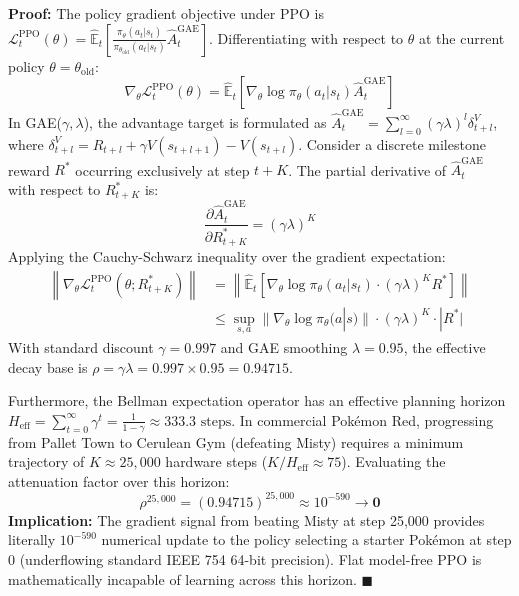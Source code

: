 \documentclass[conference]{IEEEtran}
\begin{document}
\textbf{Proof:} The policy gradient objective under PPO is $\mathcal{L}_t^{\text{PPO}}(\theta) = \hat{\mathbb{E}}_t \left[ \frac{\pi_\theta(a_t | s_t)}{\pi_{\theta_{\text{old}}}(a_t | s_t)} \hat{A}_t^{\text{GAE}} \right]$. Differentiating with respect to $\theta$ at the current policy $\theta = \theta_{\text{old}}$:
\begin{equation}
\nabla_\theta \mathcal{L}_t^{\text{PPO}}(\theta) = \hat{\mathbb{E}}_t \left[ \nabla_\theta \log \pi_\theta(a_t | s_t) \hat{A}_t^{\text{GAE}} \right]
\end{equation}
In GAE($\gamma, \lambda$), the advantage target is formulated as $\hat{A}_t^{\text{GAE}} = \sum_{l=0}^\infty (\gamma \lambda)^l \delta_{t+l}^V$, where $\delta_{t+l}^V = R_{t+l} + \gamma V(s_{t+l+1}) - V(s_{t+l})$. Consider a discrete milestone reward $R^*$ occurring exclusively at step $t+K$. The partial derivative of $\hat{A}_t^{\text{GAE}}$ with respect to $R_{t+K}^*$ is:
\begin{equation}
\frac{\partial \hat{A}_t^{\text{GAE}}}{\partial R_{t+K}^*} = (\gamma \lambda)^K
\end{equation}
Applying the Cauchy-Schwarz inequality over the gradient expectation:
\begin{align}
\left\| \nabla_\theta \mathcal{L}_t^{\text{PPO}}(\theta; R_{t+K}^*) \right\| &= \left\| \hat{\mathbb{E}}_t \left[ \nabla_\theta \log \pi_\theta(a_t | s_t) \cdot (\gamma \lambda)^K R^* \right] \right\| \nonumber \\
&\le \sup_{s, a} \|\nabla_\theta \log \pi_\theta(a | s)\| \cdot (\gamma \lambda)^K \cdot |R^*|
\end{align}
With standard discount $\gamma = 0.997$ and GAE smoothing $\lambda = 0.95$, the effective decay base is $\rho = \gamma \lambda = 0.997 \times 0.95 = 0.94715$. 

Furthermore, the Bellman expectation operator has an effective planning horizon $H_{\text{eff}} = \sum_{t=0}^\infty \gamma^t = \frac{1}{1 - \gamma} \approx 333.3\text{ steps}$. In commercial Pok{\'e}mon Red, progressing from Pallet Town to Cerulean Gym (defeating Misty) requires a minimum trajectory of $K \approx 25{,}000$ hardware steps ($K / H_{\text{eff}} \approx 75$). Evaluating the attenuation factor over this horizon:
\begin{equation}
\rho^{25{,}000} = (0.94715)^{25{,}000} \approx 10^{-590} \to \mathbf{0}
\end{equation}
\textbf{Implication:} The gradient signal from beating Misty at step 25,000 provides literally $10^{-590}$ numerical update to the policy selecting a starter Pok{\'e}mon at step 0 (underflowing standard IEEE 754 64-bit precision). Flat model-free PPO is mathematically incapable of learning across this horizon. $\blacksquare$
\end{document}
